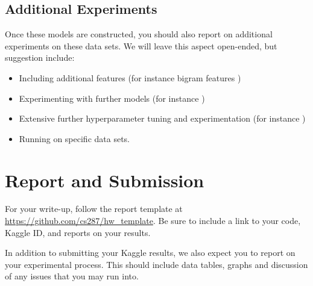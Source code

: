 \documentclass[11pt]{article}
\begin{document}
\subsection{Additional Experiments}

Once these models are constructed, you should also report on
additional experiments on these data sets. We will leave this aspect
open-ended, but suggestion include:

\begin{itemize}
\item Including additional features (for instance bigram features \cite{})
\item Experimenting with further models (for instance \cite{})
\item Extensive further hyperparameter tuning and experimentation (for instance \cite{})
\item Running on specific data sets. 
\end{itemize}

\section{Report and Submission}

For your write-up, follow the report template at
\url{https://github.com/cs287/hw_template}. Be sure to include a link
to your code, Kaggle ID, and reports on your results.

In addition to submitting your Kaggle results, we also expect you to report on your 
experimental process. This should include data tables, graphs and discussion of any 
issues that you may run into. 
\end{document}
